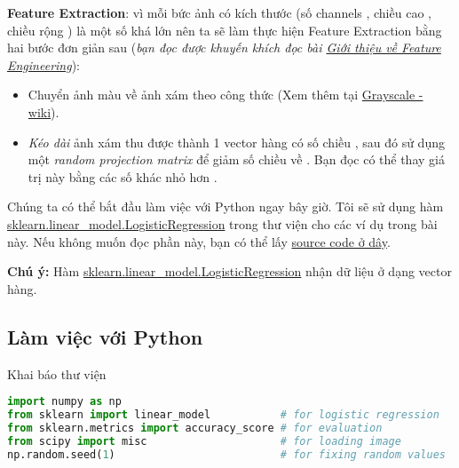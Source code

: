 \textbf{Feature Extraction}: vì mỗi bức ảnh có kích thước  (số channels , chiều cao , chiều rộng ) là một số khá lớn nên ta sẽ làm thực hiện Feature Extraction bằng hai bước đơn giản sau (\textit{bạn đọc được khuyến khích đọc bài \href{http://machinelearningcoban.com/general/2017/02/06/featureengineering/}{Giới thiệu về Feature Engineering}}):  
 
\begin{itemize}
    \item Chuyển ảnh màu về ảnh xám theo công thức  (Xem thêm tại \href{https://en.wikipedia.org/wiki/Grayscale#Luma_coding_in_video_systems}{Grayscale - wiki}).  

    \item \textit{Kéo dài} ảnh xám thu được thành 1 vector hàng có số chiều , sau đó sử dụng một \textit{random projection matrix} để giảm số chiều về . Bạn đọc có thể thay giá trị này bằng các số khác nhỏ hơn .  
\end{itemize}
 
Chúng ta có thể bắt đầu làm việc với Python ngay bây giờ. Tôi sẽ sử dụng hàm \href{http://scikit-learn.org/stable/modules/generated/sklearn.linear_model.LogisticRegression.html}{sklearn.linear\_model.LogisticRegression} trong thư viện  cho các ví dụ trong bài này. Nếu không muốn đọc phần này, bạn có thể lấy \href{http://machinelearningcoban.com/assets/LogRegs/ARgender.py}{source code ở dây}.  
 
\textbf{Chú ý:} Hàm \href{http://scikit-learn.org/stable/modules/generated/sklearn.linear_model.LogisticRegression.html}{sklearn.linear\_model.LogisticRegression} nhận dữ liệu ở dạng vector hàng.  
 
 
\subsection{Làm việc với Python}
 
Khai báo thư viện 
 
\begin{lstlisting}[language=Python]
import numpy as np  
from sklearn import linear_model           # for logistic regression 
from sklearn.metrics import accuracy_score # for evaluation 
from scipy import misc                     # for loading image 
np.random.seed(1)                          # for fixing random values 
\end{lstlisting}
 
